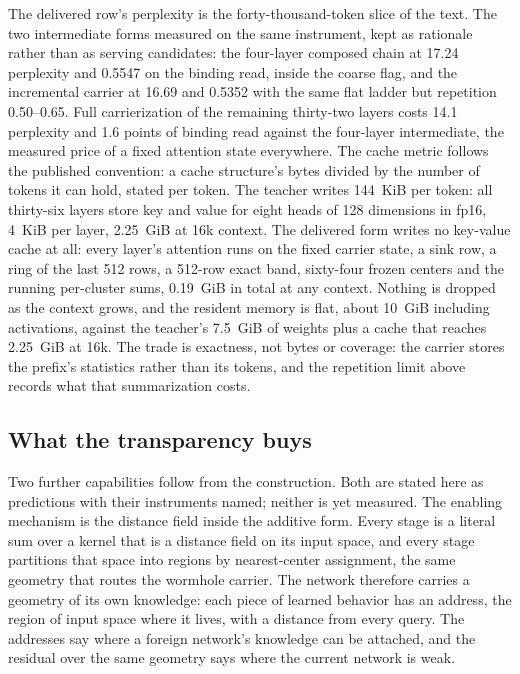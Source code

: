 \documentclass[11pt]{article}
\begin{document}
The delivered row's perplexity is the forty-thousand-token slice
of the text. The two intermediate forms measured on the same
instrument, kept as rationale rather than as serving candidates:
the four-layer composed chain at 17.24 perplexity and 0.5547 on
the binding read, inside the coarse flag, and the incremental
carrier at 16.69 and 0.5352 with the same flat ladder but
repetition 0.50--0.65. Full carrierization of the remaining
thirty-two layers costs 14.1 perplexity and 1.6 points of
binding read against the four-layer intermediate, the measured
price of a fixed attention state everywhere. The cache metric follows the published convention: a cache
structure's bytes divided by the number of tokens it can hold,
stated per token. The teacher writes 144~KiB per token: all
thirty-six layers store key and value for eight heads of 128
dimensions in fp16, 4~KiB per layer, 2.25~GiB at 16k context.
The delivered form writes no key-value cache at all: every
layer's attention runs on the fixed carrier state, a sink row, a
ring of the last 512 rows, a 512-row exact band, sixty-four
frozen centers and the running per-cluster sums, 0.19~GiB in
total at any context. Nothing is dropped as the context grows,
and the resident memory is flat, about 10~GiB including
activations, against the teacher's 7.5~GiB of weights plus a
cache that reaches 2.25~GiB at 16k. The trade is exactness, not
bytes or coverage: the carrier stores the prefix's statistics
rather than its tokens, and the repetition limit above records
what that summarization costs.

\subsection{What the transparency buys}

Two further capabilities follow from the construction. Both are
stated here as predictions with their instruments named; neither is
yet measured. The enabling mechanism is the distance field inside
the additive form. Every stage is a literal sum over a kernel that
is a distance field on its input space, and every stage partitions
that space into regions by nearest-center assignment, the same
geometry that routes the wormhole carrier. The network therefore
carries a geometry of its own knowledge: each piece of learned
behavior has an address, the region of input space where it lives,
with a distance from every query. The addresses say where a
foreign network's knowledge can be attached, and the residual over
the same geometry says where the current network is weak.
\end{document}
